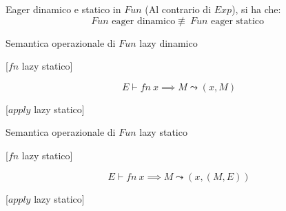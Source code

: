 \documentclass[a4paper,11pt]{report}
\begin{document}
\begin{lemmabox}{Eager dinamico e statico in \( Fun \)}{}
    (Al contrario di \( Exp \)), si ha che:
    \[ Fun \text{ eager dinamico} \not\equiv \ Fun \text{ eager statico } \]
\end{lemmabox}


\begin{prooftree}
\end{prooftree}

\begin{defbox}{Semantica operazionale di \( Fun \) lazy dinamico}{}

    \begin{center}
        [\( fn \) lazy statico]
    \end{center}
    \vspace{-1em}
    \[ E \vdash fn \ x \implies M \leadsto (x, M) \]


    \begin{center}
        [\( apply \) lazy statico]
    \end{center}
    \vspace{-2em}
    \begin{prooftree}
    \end{prooftree}
\end{defbox}
\begin{defbox}{Semantica operazionale di \( Fun \) lazy statico}{}

    \begin{center}
        [\( fn \) lazy statico]
    \end{center}
    \vspace{-1em}
    \[ E \vdash fn \ x \implies M \leadsto (x, (M, E)) \]


    \begin{center}
        [\( apply \) lazy statico]
    \end{center}
    \vspace{-2em}
    \begin{prooftree}
    \end{prooftree}
\end{defbox}
\end{document}
